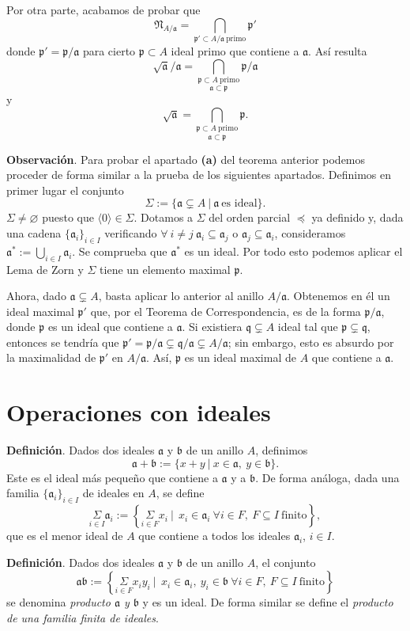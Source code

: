 \documentclass[a4paper,12pt]{article}
\newcommand{\p}{\mathfrak{p}}
\newcommand{\q}{\mathfrak{q}}
\newcommand{\af}{\mathfrak{a}}
\newcommand{\bfr}{\mathfrak{b}}
\newcommand{\Nf}{\mathfrak{N}}
\begin{document}
Por otra parte, acabamos de probar que$$\Nf_{A/\af}=\underset{\p'\subset A/\af\ \text{primo}}{\bigcap}\p'$$donde $\p'=\p/\af$ para cierto $\p\subset A$ ideal primo que contiene a $\af$.
Así resulta$$\sqrt{\af}/\af=\underset{\af\subset\p}{\bigcap_{\p\subset A\ \text{primo}}}\p/\af$$y$$\sqrt{\af}=\underset{\af\subset\p}{\bigcap_{\p\subset A\ \text{primo}}}\p.$$


\textbf{Observación}. Para probar el apartado \textbf{(a)} del teorema anterior podemos proceder de forma similar a la prueba de los siguientes apartados. Definimos en primer lugar el conjunto$$\Sigma:=\{\af\subsetneq A\ |\ \af\ \text{es ideal}\}.$$
$\Sigma\neq\varnothing$ puesto que $\langle 0\rangle\in\Sigma$. Dotamos a $\Sigma$ del orden parcial $\preceq$ ya definido y, dada una cadena $\{\af_i\}_{i\in I}$ verificando $\forall\ i\neq j\ \af_i\subseteq \af_j$ o $\af_j\subseteq\af_i$, consideramos $\af^*:=\bigcup_{i\in I}\af_i$. Se comprueba que $\af^*$ es un ideal. Por todo esto podemos aplicar el Lema de Zorn y $\Sigma$ tiene un elemento maximal $\p$.

Ahora, dado $\af\subsetneq A$, basta aplicar lo anterior al anillo $A/\af$. Obtenemos en él un ideal maximal $\p'$ que, por el Teorema de Correspondencia, es de la forma $\p/\af$, donde $\p$ es un ideal que contiene a $\af$.
Si existiera $\q\subsetneq A$ ideal tal que $\p\subsetneq\q$, entonces se tendría que $\p'=\p/\af\subsetneq\q/\af\subsetneq A/\af$; sin embargo, esto es absurdo por la maximalidad de $\p'$ en $A/\af$.
Así, $\p$ es un ideal maximal de $A$ que contiene a $\af$.

\section{Operaciones con ideales}
\textbf{Definición}. Dados dos ideales $\af$ y $\bfr$ de un anillo $A$, definimos$$\af+\bfr:=\{x+y\ |\ x\in\af,\ y\in\bfr\}.$$Este es el ideal más pequeño que contiene a $\af$ y a $\bfr$.
De forma análoga, dada una familia $\{\af_i\}_{i\in I}$ de ideales en $A$, se define$$\underset{i\in I}{\Sigma}\af_i:=\left\{\underset{i\in F}{\Sigma} x_i\ |\ \ x_i\in\af_i\ \forall i\in F,\ F\subseteq I\ \text{finito}\right\},$$que es el menor ideal de $A$ que contiene a todos los ideales $\af_i$, $i\in I$.

\textbf{Definición}. Dados dos ideales $\af$ y $\bfr$ de un anillo $A$, el conjunto$$\af\bfr:=\left\{\underset{i\in F}{\Sigma} x_iy_i\ |\ \ x_i\in\af_i,\ y_i\in\bfr\ \forall i\in F,\ F\subseteq I\ \text{finito}\right\}$$se denomina \textit{producto $\af$ y $\bfr$} y es un ideal. De forma similar se define el \textit{producto de una familia finita de ideales}.
\end{document}
